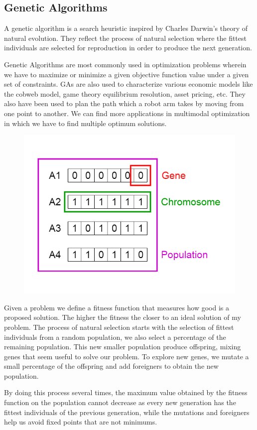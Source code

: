 \documentclass[11pt,letterpaper]{report}
\begin{document}
\subsection{Genetic Algorithms}
A genetic algorithm is a search heuristic  inspired by Charles Darwin’s theory of natural evolution. They reflect the process of natural selection where the fittest individuals are selected for reproduction in order to produce the next generation.



Genetic Algorithms are most commonly used in optimization problems wherein we have to maximize or minimize a given objective function value under a given set of constraints. GAs are also used to characterize various economic models like the cobweb model, game theory equilibrium resolution, asset pricing, etc. They also have been used to plan the path which a robot arm takes by moving from one point to another. We can find more applications in multimodal optimization in which we have to find multiple optimum solutions.



\begin{figure}[h!]
	\centering
	\includegraphics[width=0.45\linewidth]{figures/GAfigure1.png}
	\caption{}
	\label{fig:GA}
\end{figure} 	


Given a problem we define a fitness function that measures how good is a proposed solution. The higher the fitness the closer to an ideal solution of my problem.
The process of natural selection starts with the selection of fittest individuals from a random population, we also select a percentage of the remaining population. This new smaller population produce offspring, mixing genes that seem useful to solve our problem. To explore new genes, we mutate a small percentage of the offspring and add foreigners to obtain the new population.

By doing this process several times, the maximum value obtained by the fitness function on the population cannot  decrease as every new generation has the fittest individuals of the previous generation, while the mutations and foreigners help us avoid fixed points that are not minimums. 
\end{document}
